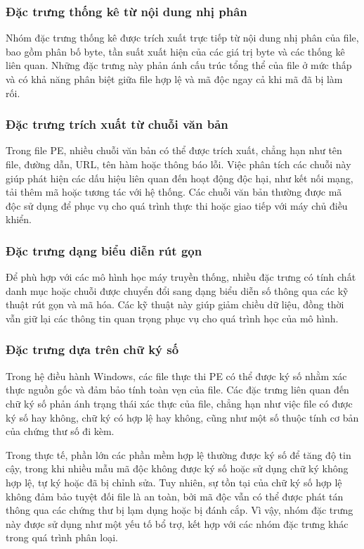 \subsubsection{Đặc trưng thống kê từ nội dung nhị phân}

Nhóm đặc trưng thống kê được trích xuất trực tiếp từ nội dung nhị phân
của file, bao gồm phân bố byte, tần suất xuất hiện của các giá trị
byte và các thống kê liên quan. Những đặc trưng này phản ánh cấu trúc
tổng thể của file ở mức thấp và có khả năng phân biệt giữa file hợp
lệ và mã độc ngay cả khi mã đã bị làm rối.

\subsubsection{Đặc trưng trích xuất từ chuỗi văn bản}

Trong file PE, nhiều chuỗi văn bản có thể được trích xuất, chẳng hạn
như tên file, đường dẫn, URL, tên hàm hoặc thông báo lỗi. Việc phân
tích các chuỗi này giúp phát hiện các dấu hiệu liên quan đến hoạt
động độc hại, như kết nối mạng, tải thêm mã hoặc tương tác với hệ
thống. Các chuỗi văn bản thường được mã độc sử dụng để phục vụ cho
quá trình thực thi hoặc giao tiếp với máy chủ điều khiển.

\subsubsection{Đặc trưng dạng biểu diễn rút gọn}

Để phù hợp với các mô hình học máy truyền thống, nhiều đặc trưng có
tính chất danh mục hoặc chuỗi được chuyển đổi sang dạng biểu diễn số
thông qua các kỹ thuật rút gọn và mã hóa. Các kỹ thuật này giúp giảm
chiều dữ liệu, đồng thời vẫn giữ lại các thông tin quan trọng phục vụ
cho quá trình học của mô hình.

\subsubsection{Đặc trưng dựa trên chữ ký số}

Trong hệ điều hành Windows, các file thực thi PE có thể được ký số
nhằm xác thực nguồn gốc và đảm bảo tính toàn vẹn của file. Các đặc
trưng liên quan đến chữ ký số phản ánh trạng thái xác thực của file,
chẳng hạn như việc file có được ký số hay không, chữ ký có hợp lệ hay
không, cũng như một số thuộc tính cơ bản của chứng thư số đi kèm.

Trong thực tế, phần lớn các phần mềm hợp lệ thường được ký số để tăng
độ tin cậy, trong khi nhiều mẫu mã độc không được ký số hoặc sử dụng
chữ ký không hợp lệ, tự ký hoặc đã bị chỉnh sửa. Tuy nhiên, sự tồn
tại của chữ ký số hợp lệ không đảm bảo tuyệt đối file là an toàn,
bởi mã độc vẫn có thể được phát tán thông qua các chứng thư bị lạm
dụng hoặc bị đánh cắp. Vì vậy, nhóm đặc trưng này được sử dụng như
một yếu tố bổ trợ, kết hợp với các nhóm đặc trưng khác trong quá
trình phân loại.

